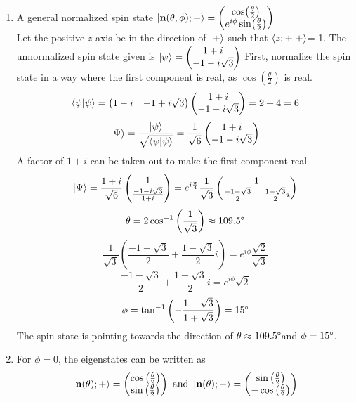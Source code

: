 \begin{sol}
\begin{enumerate}[label=\textbf{(\alph*)}]
\item
A general normalized spin state $\ket{\mathbf{n}(\theta,\phi);+}=\begin{pmatrix}\cos(\frac{\theta}{2})\\e^{i\phi}\sin(\frac{\theta}{2})\end{pmatrix}$\\
Let the positive $z$ axis be in the direction of $\ket{+}$ such that $\braket{z;+}{+}$= 1. The unnormalized spin state given is $\ket{\psi}=\begin{pmatrix}1+i\\-1-i\sqrt{3}\end{pmatrix}$ 
First, normalize the spin state in a way where the first component is real, as $\cos(\frac{\theta}{2})$ is real.
$$\braket{\psi}{\psi}=\begin{pmatrix}1-i & -1+i\sqrt{3}\end{pmatrix}\begin{pmatrix}1+i\\-1-i\sqrt{3}\end{pmatrix}=2+4=6$$
$$\ket\Psi=\frac{\ket\psi}{\sqrt{\braket{\psi}{\psi}}}=\frac{1}{\sqrt 6}\begin{pmatrix}1+i\\-1-i\sqrt{3}\end{pmatrix}$$
A factor of $1+i$ can be taken out to make the first component real
$$\ket\Psi=\frac{1+i}{\sqrt 6}\begin{pmatrix}1\\\frac{-1-i\sqrt 3}{1+i}\end{pmatrix}=e^{i\frac{\pi}{4}}\frac{1}{\sqrt{3}}\begin{pmatrix}1\\\frac{-1-\sqrt{3}}{2}+\frac{1-\sqrt{3}}{2}i\end{pmatrix}$$
$$\theta=2\cos^{-1}\left(\frac{1}{\sqrt{3}}\right)\approx 109.5\degree$$ 
$$\frac{1}{\sqrt 3}\left(\frac{-1-\sqrt{3}}{2}+\frac{1-\sqrt{3}}{2}i\right)=e^{i\phi}\frac{\sqrt{2}}{\sqrt{3}}$$
$$\frac{-1-\sqrt{3}}{2}+\frac{1-\sqrt{3}}{2}i=e^{i\phi}\sqrt{2}$$ 
$$\phi=\tan^{-1}\left(-\frac{1-\sqrt{3}}{1+\sqrt{3}}\right)=15\degree$$ 
The spin state is pointing towards the direction of $\theta\approx 109.5\degree$and $\phi=15\degree$.
\item
For $\phi=0$, the eigenstates can be written as
$$\ket{\mathbf{n}(\theta);+}=\begin{pmatrix}\cos\left(\frac{\theta}{2}\right)\\\sin\left(\frac{\theta}{2}\right)\end{pmatrix} \text{ and }\ket{\mathbf{n}(\theta);-}=\begin{pmatrix}\sin\left(\frac{\theta}{2}\right)\\-\cos\left(\frac{\theta}{2}\right)\end{pmatrix}$$  

\end{enumerate}
\end{sol}
